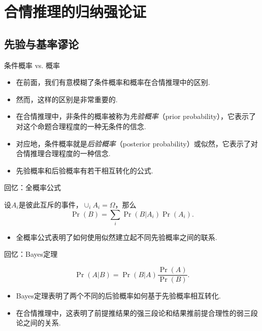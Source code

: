 \section{合情推理的归纳强论证}

\subsection{先验与基率谬论}
\begin{frame}{条件概率 vs. 概率}
\begin{itemize}
    \item 在前面，我们有意模糊了条件概率和概率在合情推理中的区别.
    \item 然而，这样的区别是非常重要的.
    \item 在合情推理中，非条件的概率被称为\emph{先验概率}（prior probability），它表示了对这个命题合理程度的一种无条件的信念.
    \item 对应地，条件概率就是\emph{后验概率}（posterior probability）或似然，它表示了对合情推理合理程度的一种信念.
    \item 先验概率和后验概率有若干相互转化的公式.
\end{itemize}
\end{frame}
\begin{frame}{回忆：全概率公式}
\begin{theorem}[全概率公式]
设$A_i$是彼此互斥的事件，$\cup_i A_i=\Omega$，那么
    \[\Pr(B)=\sum_{i}\Pr(B|A_i)\Pr(A_i).\]
\end{theorem}
\begin{itemize}
    \item 全概率公式表明了如何使用似然建立起不同先验概率之间的联系.
\end{itemize}
\end{frame}
\begin{frame}{回忆：Bayes定理}
\begin{theorem}[Bayes定理]
    \[\Pr(A|B) = \Pr(B|A)\frac{\Pr(A)}{\Pr(B)}.\]
\end{theorem}
    \begin{itemize}
        \item Bayes定理表明了两个不同的后验概率如何基于先验概率相互转化.
        \item 在合情推理中，这表明了前提推结果的强三段论和结果推前提合理性的弱三段论之间的关系.
    \end{itemize}
\end{frame}

